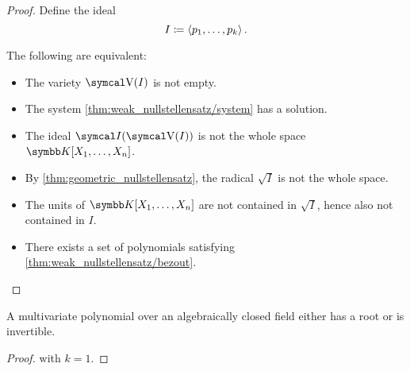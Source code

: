 \begin{proof}
  Define the ideal
  \begin{equation*}
    I \coloneqq \left\langle p_1, \ldots, p_k \right\rangle.
  \end{equation*}

  The following are equivalent:
  \begin{itemize}
    \item The variety \( \V(I) \) is not empty.
    \item The system \cref{thm:weak_nullstellensatz/system} has a solution.
    \item The ideal \( \Cal{I}(\V(I)) \) is not the whole space \( \K[X_1, \ldots, X_n] \).
    \item By \cref{thm:geometric_nullstellensatz}, the radical \( \sqrt I \) is not the whole space.
    \item The units of \( \K[X_1, \ldots, X_n] \) are not contained in \( \sqrt I \), hence also not contained in \( I \).
    \item There exists a set of polynomials satisfying \cref{thm:weak_nullstellensatz/bezout}.
  \end{itemize}
\end{proof}

\begin{corollary}\label{thm:polynomial_over_closed_field_is_either_invertible_or_has_root}
  A multivariate polynomial over an algebraically closed field either has a root or is invertible.
\end{corollary}
\begin{proof}
   with \( k = 1 \).
\end{proof}
